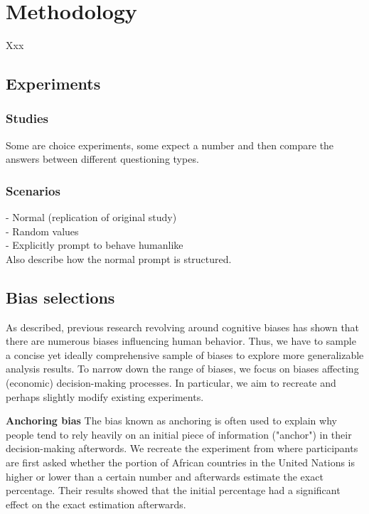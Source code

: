 \section{Methodology}
Xxx

\subsection{Experiments}
\subsubsection{Studies}
Some are choice experiments, some expect a number and then compare the answers between different questioning types.

\subsubsection{Scenarios}
- Normal (replication of original study) \\
- Random values \\
- Explicitly prompt to behave humanlike \\

Also describe how the normal prompt is structured.


\subsection{Bias selections}
\par As described, previous research revolving around cognitive biases has shown that there are numerous biases influencing human behavior. Thus, we have to sample a concise yet ideally comprehensive sample of biases to explore more generalizable analysis results. To narrow down the range of biases, we focus on biases affecting (economic) decision-making processes. In particular, we aim to recreate and perhaps slightly modify existing experiments.

\setlength{\parindent}{20pt}
\par \textbf{Anchoring bias} The bias known as anchoring is often used to explain why people tend to rely heavily on an initial piece of information ("anchor") in their decision-making afterwords. We recreate the experiment from \textcite{tversky1974judgment} where participants are first asked whether the portion of African countries in the United Nations is higher or lower than a certain number and afterwards estimate the exact percentage. Their results showed that the initial percentage had a significant effect on the exact estimation afterwards.

